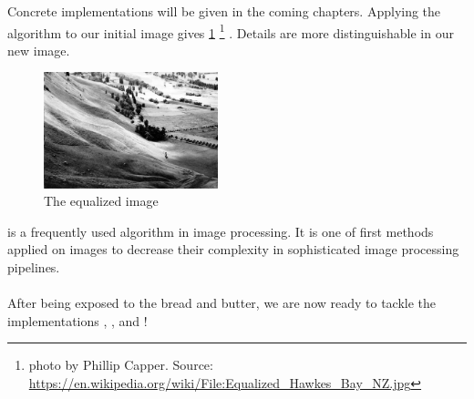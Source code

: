       Concrete implementations will be given in the coming chapters.
      Applying the algorithm to our initial image gives \ref{fig:img-eq}
      \footnote{photo by Phillip Capper. Source: \url{https://en.wikipedia.org/wiki/File:Equalized_Hawkes_Bay_NZ.jpg}}
      . Details are more distinguishable in our new image.
      
      \begin{figure}[h]
        \centering
        \includegraphics[width=0.45\textwidth]{img-eq}
        \caption{The equalized image}
        \label{fig:img-eq}
      \end{figure}
    
  \algo{} is a frequently used algorithm in image processing. It is 
  one of first methods applied on images to decrease their complexity
  in sophisticated image processing pipelines.
  
  \paragraph{}
  After being exposed to the bread and butter, we are now ready to tackle the
  implementations \seq, \man, \ndpn and \ndpv!
  
    
